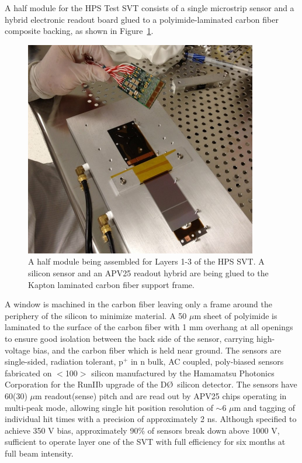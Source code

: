 A half module for the HPS Test SVT consists of a single microstrip sensor and a hybrid electronic readout board glued to a polyimide-laminated carbon fiber composite backing, as shown in Figure~\ref{fig:halfmodule_L1-3}.  
\begin{figure}[ht]
    \includegraphics[width=4in]{svt/figures/half_module.jpg}
\caption{\small{A half module being assembled for Layers 1-3 of the HPS SVT. A silicon sensor and an APV25 readout hybrid are being glued to the Kapton laminated carbon fiber support frame.} }
\label{fig:halfmodule_L1-3}
\end{figure}
A window is machined in the carbon fiber leaving only a frame around the periphery of the silicon to minimize material. A 50 $\mu$m sheet of polyimide is laminated to the surface of the carbon fiber with 1 mm overhang at all openings to ensure good isolation between the back side of the sensor, carrying high-voltage bias, and the carbon fiber which is held near ground.  The sensors are single-sided, radiation tolerant, p$^+$ in n bulk, AC coupled, poly-biased sensors fabricated on $<$100$>$ silicon manufactured by the Hamamatsu Photonics Corporation for the RunIIb upgrade of the D\O\ silicon detector. The sensors have 60(30) $\mu$m readout(sense) pitch and are read out by APV25 chips operating in multi-peak mode, allowing single hit position resolution of $\sim$6 $\mu$m and tagging of individual hit times with a precision of approximately 2 ns.  Although specified to achieve 350 V bias, approximately 90\% of sensors break down above 1000 V, sufficient to operate layer one of the SVT with full efficiency for six months at full beam intensity.

